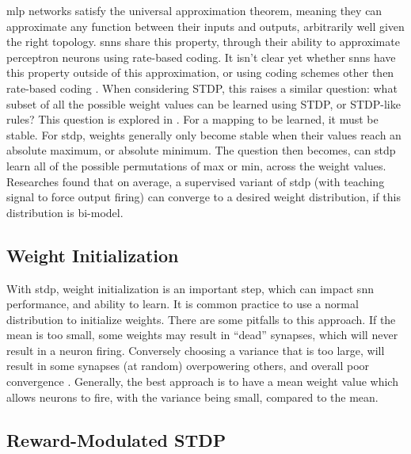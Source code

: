 

    \Gls{mlp} networks satisfy the universal approximation theorem, meaning they
    can approximate any function between their inputs and outputs, arbitrarily
    well given the right topology. \Glspl{snn} share this property, through
    their ability to approximate perceptron neurons using rate-based coding. It
    isn't clear yet whether \glspl{snn} have this property outside of this
    approximation, or using coding schemes other then rate-based coding
    \parencite{legenstein_2005}. When considering STDP, this raises a similar
    question: what subset of all the possible weight values can be learned using
    STDP, or STDP-like rules? This question is explored in
    \parencite{legenstein_2005}. For a mapping to be learned, it must be
    stable. For \gls{stdp}, weights generally only become stable when their
    values reach an absolute maximum, or absolute minimum. The question then
    becomes, can \gls{stdp} learn all of the possible permutations of max or
    min, across the weight values. Researches found that on average, a
    supervised variant of \gls{stdp} (with teaching signal to force output
    firing) can converge to a desired weight distribution, if this distribution
    is bi-model.

    \subsection{Weight Initialization}
    
    With \gls{stdp}, weight initialization is an important step, which can
    impact \gls{snn} performance, and ability to learn. It is common practice to
    use a normal distribution to initialize weights. There are some pitfalls to
    this approach. If the mean is too small, some weights may result in
    ``dead'' synapses, which will never result in a neuron firing. Conversely
    choosing a variance that is too large, will result in some
    synapses (at random) overpowering others, and overall poor convergence
    \parencite{vigneron_2020}. Generally, the best approach is to have a mean
    weight value which allows neurons to fire, with the variance being small,
    compared to the mean.

    \subsection{Reward-Modulated STDP}
    
